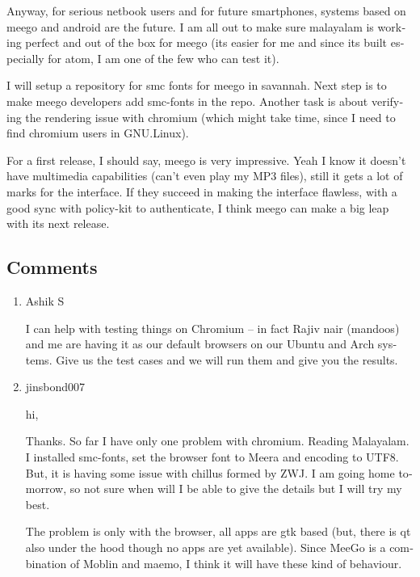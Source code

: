 \begin{english}
Anyway, for serious netbook users and for future smartphones, systems based on meego and android are the 
future. I am all out to make sure malayalam is working perfect and out of the box for meego (its easier 
for me and since its built especially for atom, I am one of the few who can test it).

I will setup a repository for smc fonts for meego in savannah. Next step is to make meego developers add smc-fonts 
in the repo. Another task is about verifying the rendering issue with chromium (which might take time, since I need to 
find chromium users in GNU.Linux).

For a first release, I should say, meego is very impressive. Yeah I know it doesn't have multimedia capabilities (can't even 
play my MP3 files), still it gets a lot of marks for the interface. If they succeed in making the interface flawless, 
with a good sync with policy-kit to authenticate, I think meego can make a big leap with its next release.


\subsection*{Comments}
\begin{enumerate}
 \item{Ashik S}
 
I can help with testing things on Chromium – in fact Rajiv nair (mandoos) and me are having it as our default browsers on 
our Ubuntu and Arch systems. Give us the test cases and we will run them and give you the results.

 \item{jinsbond007}
 
hi,

Thanks. So far I have only one problem with chromium. Reading Malayalam.
I installed smc-fonts, set the browser font to Meera and encoding to UTF8. But, it is having some issue with chillus 
formed by ZWJ.
I am going home tomorrow, so not sure when will I be able to give the details but I will try my best. 

The problem is only with the browser, all apps are gtk based (but, there is qt also under the hood though no apps 
are yet available). Since MeeGo is a combination of Moblin and maemo, I think it will have these kind of behaviour. 

\end{enumerate}
\end{english}
\newpage 
